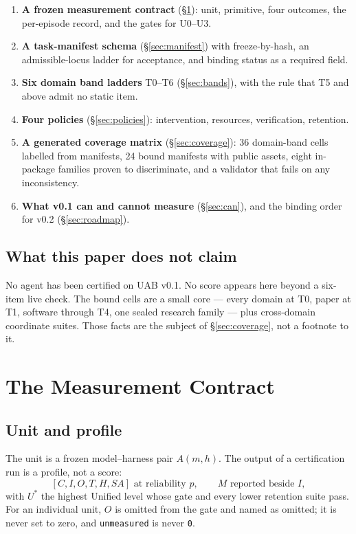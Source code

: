 \documentclass[11pt]{article}
\theoremstyle{definition}
\begin{document}
\begin{enumerate}[leftmargin=*]
\item \textbf{A frozen measurement contract} (\S\ref{sec:contract}): unit, primitive, four outcomes, the per-episode record, and the gates for U0--U3.
\item \textbf{A task-manifest schema} (\S\ref{sec:manifest}) with freeze-by-hash, an admissible-locus ladder for acceptance, and binding status as a required field.
\item \textbf{Six domain band ladders} T0--T6 (\S\ref{sec:bands}), with the rule that T5 and above admit no static item.
\item \textbf{Four policies} (\S\ref{sec:policies}): intervention, resources, verification, retention.
\item \textbf{A generated coverage matrix} (\S\ref{sec:coverage}): 36 domain-band cells labelled from manifests, 24 bound manifests with public assets, eight in-package families proven to discriminate, and a validator that fails on any inconsistency.
\item \textbf{What v0.1 can and cannot measure} (\S\ref{sec:can}), and the binding order for v0.2 (\S\ref{sec:roadmap}).
\end{enumerate}

\subsection{What this paper does not claim}

No agent has been certified on UAB v0.1. No score appears here beyond a six-item live check. The bound cells are a small core --- every domain at T0, paper at T1, software through T4, one sealed research family --- plus cross-domain coordinate suites. Those facts are the subject of \S\ref{sec:coverage}, not a footnote to it.

\section{The Measurement Contract}\label{sec:contract}

\subsection{Unit and profile}

The unit is a frozen model--harness pair $A(m,h)$. The output of a certification run is a profile, not a score:
\[
[C, I, O, T, H, SA] \text{ at reliability } p, \qquad M \text{ reported beside } I,
\]
with $U^{*}$ the highest Unified level whose gate and every lower retention suite pass. For an individual unit, $O$ is omitted from the gate and named as omitted; it is never set to zero, and \texttt{unmeasured} is never \texttt{0}.
\end{document}
